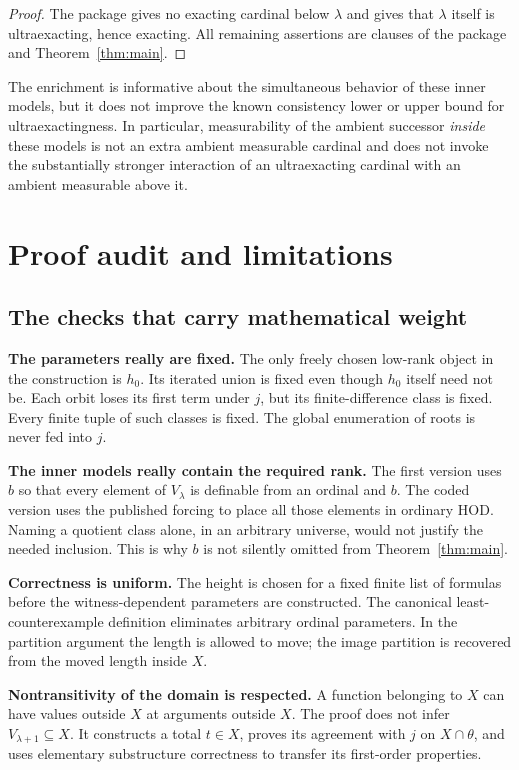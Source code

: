 \documentclass[11pt,letterpaper]{article}
\theoremstyle{definition}
\numberwithin{equation}{section}
\newcommand{\HOD}{\mathrm{HOD}}
\begin{document}
\begin{proof}
The package gives no exacting cardinal below $\lambda$ and gives that $\lambda$ itself is ultraexacting, hence exacting. All remaining assertions are clauses of the package and Theorem~\ref{thm:main}.
\end{proof}

The enrichment is informative about the simultaneous behavior of these inner models, but it does not improve the known consistency lower or upper bound for ultraexactingness. In particular, measurability of the ambient successor \emph{inside} these models is not an extra ambient measurable cardinal and does not invoke the substantially stronger interaction of an ultraexacting cardinal with an ambient measurable above it.

\section{Proof audit and limitations}\label{sec:audit}

\subsection{The checks that carry mathematical weight}

\textbf{The parameters really are fixed.}
The only freely chosen low-rank object in the construction is $h_0$. Its iterated union is fixed even though $h_0$ itself need not be. Each orbit loses its first term under $j$, but its finite-difference class is fixed. Every finite tuple of such classes is fixed. The global enumeration of roots is never fed into $j$.

\textbf{The inner models really contain the required rank.}
The first version uses $b$ so that every element of $V_\lambda$ is definable from an ordinal and $b$. The coded version uses the published forcing to place all those elements in ordinary $\HOD$. Naming a quotient class alone, in an arbitrary universe, would not justify the needed inclusion. This is why $b$ is not silently omitted from Theorem~\ref{thm:main}.

\textbf{Correctness is uniform.}
The height is chosen for a fixed finite list of formulas before the witness-dependent parameters are constructed. The canonical least-counterexample definition eliminates arbitrary ordinal parameters. In the partition argument the length is allowed to move; the image partition is recovered from the moved length inside $X$.

\textbf{Nontransitivity of the domain is respected.}
A function belonging to $X$ can have values outside $X$ at arguments outside $X$. The proof does not infer $V_{\lambda+1}\subseteq X$. It constructs a total $t\in X$, proves its agreement with $j$ on $X\cap\theta$, and uses elementary substructure correctness to transfer its first-order properties.
\end{document}
